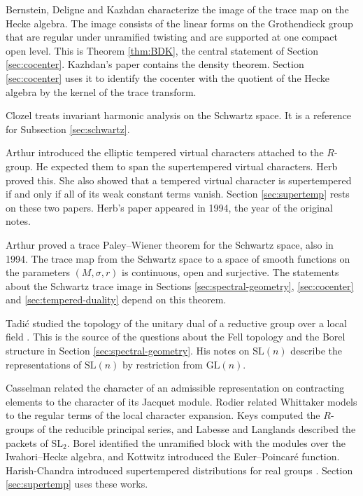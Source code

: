 \documentclass[12pt,letterpaper]{amsart}
\numberwithin{equation}{section}
\theoremstyle{definition}
\theoremstyle{remark}
\begin{document}
Bernstein, Deligne and Kazhdan \cite{BDK86} characterize the image of the trace map on the Hecke algebra. The image consists of the linear forms on the Grothendieck group that are regular under unramified twisting and are supported at one compact open level. This is Theorem \ref{thm:BDK}, the central statement of Section \ref{sec:cocenter}. Kazhdan's paper \cite{Ka86} contains the density theorem. Section \ref{sec:cocenter} uses it to identify the cocenter with the quotient of the Hecke algebra by the kernel of the trace transform.

Clozel \cite{Cl91} treats invariant harmonic analysis on the Schwartz space. It is a reference for Subsection \ref{sec:schwartz}.

Arthur \cite{Ar93} introduced the elliptic tempered virtual characters attached to the $R$-group. He expected them to span the supertempered virtual characters. Herb \cite{He94} proved this. She also showed that a tempered virtual character is supertempered if and only if all of its weak constant terms vanish. Section \ref{sec:supertemp} rests on these two papers. Herb's paper appeared in 1994, the year of the original notes.

Arthur \cite{Ar94} proved a trace Paley--Wiener theorem for the Schwartz space, also in 1994. The trace map from the Schwartz space to a space of smooth functions on the parameters $(M,\sigma,r)$ is continuous, open and surjective. The statements about the Schwartz trace image in Sections \ref{sec:spectral-geometry}, \ref{sec:cocenter} and \ref{sec:tempered-duality} depend on this theorem.

Tadi\'c studied the topology of the unitary dual of a reductive group over a local field \cite{Ta83}. This is the source of the questions about the Fell topology and the Borel structure in Section \ref{sec:spectral-geometry}. His notes on $\mathrm{SL}(n)$ \cite{Ta92} describe the representations of $\mathrm{SL}(n)$ by restriction from $\mathrm{GL}(n)$.

Casselman \cite{Ca77} related the character of an admissible representation on contracting elements to the character of its Jacquet module. Rodier \cite{Ro75} related Whittaker models to the regular terms of the local character expansion. Keys \cite{Ke82} computed the $R$-groups of the reducible principal series, and Labesse and Langlands \cite{LL79} described the packets of $\mathrm{SL}_2$. Borel \cite{Bo76} identified the unramified block with the modules over the Iwahori--Hecke algebra, and Kottwitz \cite{Ko88} introduced the Euler--Poincar\'e function. Harish-Chandra introduced supertempered distributions for real groups \cite{HC83}. Section \ref{sec:supertemp} uses these works.
\end{document}
